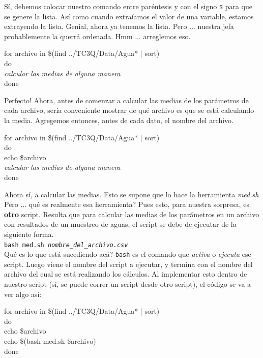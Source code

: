\documentclass[10pt,letterpaper]{article}
\newcommand{\inlinecode}[1]{
\colorbox{light-gray}{\texttt{#1}}
}
\newenvironment{Code}
{
\begin{lrbox}{\selvestebox}%
\begin{minipage}{\dimexpr\columnwidth-2\fboxsep\relax}
\fontfamily{\ttdefault}\selectfont
}
{\end{minipage}\end{lrbox}%
\begin{center}
\colorbox{light-gray}{\usebox{\selvestebox}}
\end{center}
}
\begin{document}
S\'i, debemos colocar nuestro comando entre par\'entesis y con el signo \inlinecode{\$} para que se genere la lista. As\'i como cuando extra\'iamos el valor de una variable, estamos extrayendo la lista. Genial, ahora ya tenemos la lista. Pero ... nuestra jefa probablemente la querr\'a ordenada. Hmm ... arreglemos eso.

\begin{Code}
for archivo in \$(find ../TC3Q/Data/Agua* | sort)\\
do\\
\emph{calcular las medias de alguna manera}\\
done
\end{Code}

Perfecto! Ahora, antes de comenzar a calcular las medias de los par\'ametros de cada archivo, ser\'ia conveniente mostrar de qu\'e archivo es que se est\'a calculando la media. Agregemos entonces, antes de cada dato, el nombre del archivo.

\begin{Code}
for archivo in \$(find ../TC3Q/Data/Agua* | sort)\\
do\\
echo \$archivo\\
\emph{calcular las medias de alguna manera}\\
done
\end{Code}

Ahora s\'i, a calcular las medias. Esto se supone que lo hace la herramienta \emph{med.sh} Pero ... qu\'e es realmente esa herramienta? Pues esto, para nuestra sorpresa, es \textbf{otro} script. Resulta que para calcular las medias de los par\'ametros en un archivo con resultados de un muestreo de aguas, el script se debe de ejecutar de la siguiente forma.\\
\inlinecode{bash med.sh \emph{nombre\_del\_archivo.csv}}\\

Qu\'e es lo que est\'a sucediendo ac\'a? \inlinecode{bash} es el comando que \emph{activa} o \emph{ejecuta} ese script. Luego viene el nombre del script a ejecutar, y termina con el nombre del archivo del cual se est\'a realizando los c\'alculos. Al implementar esto dentro de nuestro script (s\'i, se puede correr un script desde otro script), el c\'odigo se va a ver algo as\'i:

\begin{Code}
for archivo in \$(find ../TC3Q/Data/Agua* | sort)\\
do\\
echo \$archivo\\
echo \$(bash med.sh \$archivo)\\
done
\end{Code}
\end{document}
